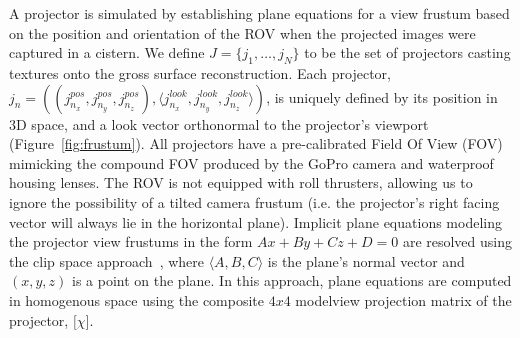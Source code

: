 \documentclass[a4paper,twoside]{article}
\begin{document}
A projector is simulated by establishing plane equations for a view frustum based on the position and orientation of the ROV when the projected images were captured in a cistern. We define $J = \{j_{1},\dots,j_{N}\}$ to be the set of projectors casting textures onto the gross surface reconstruction. Each projector, $j_{n} = ((j_{n_{x}}^{pos},j_{n_{y}}^{pos},j_{n_{z}}^{pos}), \langle j_{n_{x}}^{look},j_{n_{y}}^{look},j_{n_{z}}^{look}\rangle)$, is uniquely defined by its position in 3D space, and a look vector orthonormal to the projector's viewport (Figure~\ref{fig:frustum}). All projectors have a pre-calibrated Field Of View (FOV) mimicking the compound FOV produced by the GoPro camera and waterproof housing lenses. The ROV is not equipped with roll thrusters, allowing us to ignore the possibility of a tilted camera frustum (i.e. the projector's right facing vector will always lie in the horizontal plane). Implicit plane equations modeling the projector view frustums in the form $Ax + By + Cz + D = 0$ are resolved using the clip space approach~\cite{vfc}, where $\langle A, B, C\rangle$ is the plane's normal vector and  $(x, y, z)$ is a point on the plane. In this approach, plane equations are computed in homogenous space using the composite $4x4$ modelview projection matrix of the projector, $\lbrack \chi \rbrack$.
\end{document}

